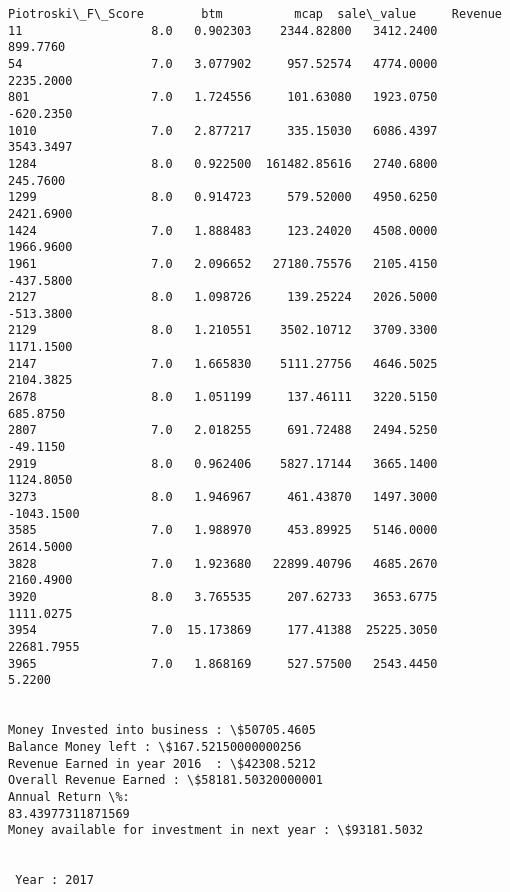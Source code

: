 \documentclass[11pt]{article}
\begin{document}
\begin{Verbatim}[commandchars=\\\{\}]
      Piotroski\_F\_Score        btm          mcap  sale\_value     Revenue
11                  8.0   0.902303    2344.82800   3412.2400    899.7760
54                  7.0   3.077902     957.52574   4774.0000   2235.2000
801                 7.0   1.724556     101.63080   1923.0750   -620.2350
1010                7.0   2.877217     335.15030   6086.4397   3543.3497
1284                8.0   0.922500  161482.85616   2740.6800    245.7600
1299                8.0   0.914723     579.52000   4950.6250   2421.6900
1424                7.0   1.888483     123.24020   4508.0000   1966.9600
1961                7.0   2.096652   27180.75576   2105.4150   -437.5800
2127                8.0   1.098726     139.25224   2026.5000   -513.3800
2129                8.0   1.210551    3502.10712   3709.3300   1171.1500
2147                7.0   1.665830    5111.27756   4646.5025   2104.3825
2678                8.0   1.051199     137.46111   3220.5150    685.8750
2807                7.0   2.018255     691.72488   2494.5250    -49.1150
2919                8.0   0.962406    5827.17144   3665.1400   1124.8050
3273                8.0   1.946967     461.43870   1497.3000  -1043.1500
3585                7.0   1.988970     453.89925   5146.0000   2614.5000
3828                7.0   1.923680   22899.40796   4685.2670   2160.4900
3920                8.0   3.765535     207.62733   3653.6775   1111.0275
3954                7.0  15.173869     177.41388  25225.3050  22681.7955
3965                7.0   1.868169     527.57500   2543.4450      5.2200


Money Invested into business : \$50705.4605
Balance Money left : \$167.52150000000256
Revenue Earned in year 2016  : \$42308.5212
Overall Revenue Earned : \$58181.50320000001
Annual Return \%:
83.43977311871569
Money available for investment in next year : \$93181.5032


 Year : 2017


\end{Verbatim}
\end{document}
